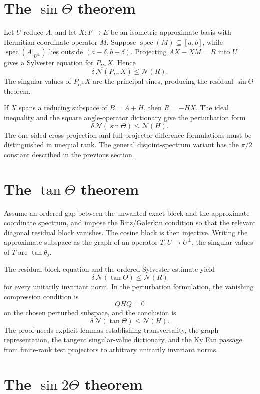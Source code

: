 \documentclass[11pt]{article}
\newcommand{\Nn}{\mathcal N}
\newcommand{\spec}{\operatorname{spec}}
\theoremstyle{remark}
\begin{document}
\section{The \texorpdfstring{$\sin\Theta$}{sin Theta} theorem}

Let \(U\) reduce \(A\), and let \(X:F\to E\) be an isometric approximate
basis with Hermitian coordinate operator \(M\).  Suppose
\(\spec(M)\subseteq[a,b]\), while
\(\spec(A|_{U^\perp})\) lies outside
\((a-\delta,b+\delta)\).  Projecting
\(AX-XM=R\) into \(U^\perp\) gives a Sylvester equation for
\(P_{U^\perp}X\).  Hence
\[
  \delta\,\Nn(P_{U^\perp}X)\le\Nn(R).
\]
The singular values of \(P_{U^\perp}X\) are the principal sines, producing the
residual \(\sin\Theta\) theorem.

If \(X\) spans a reducing subspace of \(B=A+H\), then
\(R=-HX\).  The ideal inequality and the square angle-operator dictionary give
the perturbation form
\[
  \delta\,\Nn(\sin\Theta)\le\Nn(H).
\]
The one-sided cross-projection and full projector-difference formulations must
be distinguished in unequal rank.  The general disjoint-spectrum variant has
the \(\pi/2\) constant described in the previous section.

\section{The \texorpdfstring{$\tan\Theta$}{tan Theta} theorem}

Assume an ordered gap between the unwanted exact block and the approximate
coordinate spectrum, and impose the Ritz/Galerkin condition so that the
relevant diagonal residual block vanishes.  The cosine block is then injective.
Writing the approximate subspace as the graph of an operator \(T:U\to U^\perp\),
the singular values of \(T\) are \(\tan\theta_j\).

The residual block equation and the ordered Sylvester estimate yield
\[
  \delta\,\Nn(\tan\Theta)\le\Nn(R)
\]
for every unitarily invariant norm.  In the perturbation formulation, the
vanishing compression condition is
\[
  QHQ=0
\]
on the chosen perturbed subspace, and the conclusion is
\[
  \delta\,\Nn(\tan\Theta)\le\Nn(H).
\]
The proof needs explicit lemmas establishing transversality, the graph
representation, the tangent singular-value dictionary, and the Ky Fan passage
from finite-rank test projectors to arbitrary unitarily invariant norms.

\section{The \texorpdfstring{$\sin 2\Theta$}{sin 2 Theta} theorem}
\end{document}
